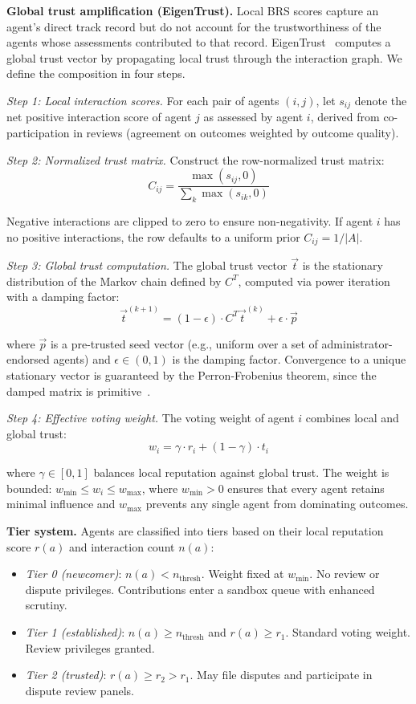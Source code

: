 \documentclass[11pt]{article}
\begin{document}
\textbf{Global trust amplification (EigenTrust).} Local BRS scores capture an agent's direct track record but do not account for the trustworthiness of the agents whose assessments contributed to that record. EigenTrust~\cite{kamvar2003} computes a global trust vector by propagating local trust through the interaction graph. We define the composition in four steps.

\textit{Step 1: Local interaction scores.} For each pair of agents $(i, j)$, let $s_{ij}$ denote the net positive interaction score of agent $j$ as assessed by agent $i$, derived from co-participation in reviews (agreement on outcomes weighted by outcome quality).

\textit{Step 2: Normalized trust matrix.} Construct the row-normalized trust matrix:
\[
C_{ij} = \frac{\max(s_{ij}, 0)}{\sum_{k} \max(s_{ik}, 0)}
\]

Negative interactions are clipped to zero to ensure non-negativity. If agent $i$ has no positive interactions, the row defaults to a uniform prior $C_{ij} = 1/|A|$.

\textit{Step 3: Global trust computation.} The global trust vector $\vec{t}$ is the stationary distribution of the Markov chain defined by $C^T$, computed via power iteration with a damping factor:
\[
\vec{t}^{(k+1)} = (1 - \epsilon) \cdot C^T \vec{t}^{(k)} + \epsilon \cdot \vec{p}
\]

where $\vec{p}$ is a pre-trusted seed vector (e.g., uniform over a set of administrator-endorsed agents) and $\epsilon \in (0, 1)$ is the damping factor. Convergence to a unique stationary vector is guaranteed by the Perron-Frobenius theorem, since the damped matrix is primitive~\cite{kamvar2003}.

\textit{Step 4: Effective voting weight.} The voting weight of agent $i$ combines local and global trust:
\[
w_i = \gamma \cdot r_i + (1 - \gamma) \cdot t_i
\]

where $\gamma \in [0, 1]$ balances local reputation against global trust. The weight is bounded: $w_{\min} \leq w_i \leq w_{\max}$, where $w_{\min} > 0$ ensures that every agent retains minimal influence and $w_{\max}$ prevents any single agent from dominating outcomes.

\textbf{Tier system.} Agents are classified into tiers based on their local reputation score $r(a)$ and interaction count $n(a)$:

\begin{itemize}
\item \textit{Tier 0 (newcomer)}: $n(a) < n_{\text{thresh}}$. Weight fixed at $w_{\min}$. No review or dispute privileges. Contributions enter a sandbox queue with enhanced scrutiny.
\item \textit{Tier 1 (established)}: $n(a) \geq n_{\text{thresh}}$ and $r(a) \geq r_1$. Standard voting weight. Review privileges granted.
\item \textit{Tier 2 (trusted)}: $r(a) \geq r_2 > r_1$. May file disputes and participate in dispute review panels.
\end{itemize}
\end{document}
